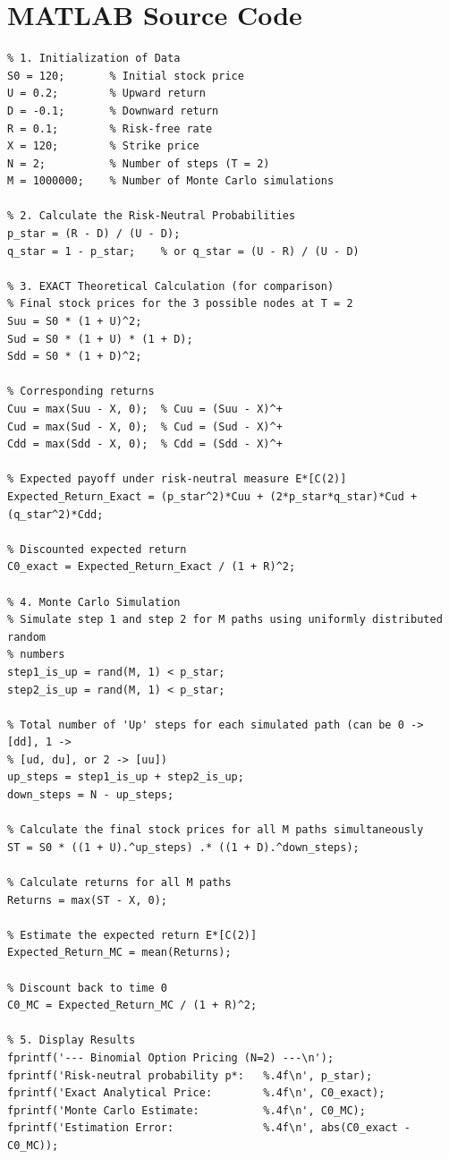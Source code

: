 \documentclass[12pt, a4paper]{article}
\begin{document}
\section{MATLAB Source Code}
\begin{lstlisting}
% 1. Initialization of Data
S0 = 120;       % Initial stock price
U = 0.2;        % Upward return
D = -0.1;       % Downward return
R = 0.1;        % Risk-free rate
X = 120;        % Strike price
N = 2;          % Number of steps (T = 2)
M = 1000000;    % Number of Monte Carlo simulations

% 2. Calculate the Risk-Neutral Probabilities
p_star = (R - D) / (U - D);
q_star = 1 - p_star;    % or q_star = (U - R) / (U - D)

% 3. EXACT Theoretical Calculation (for comparison)
% Final stock prices for the 3 possible nodes at T = 2
Suu = S0 * (1 + U)^2;
Sud = S0 * (1 + U) * (1 + D);
Sdd = S0 * (1 + D)^2;

% Corresponding returns
Cuu = max(Suu - X, 0);  % Cuu = (Suu - X)^+
Cud = max(Sud - X, 0);  % Cud = (Sud - X)^+
Cdd = max(Sdd - X, 0);  % Cdd = (Sdd - X)^+

% Expected payoff under risk-neutral measure E*[C(2)]
Expected_Return_Exact = (p_star^2)*Cuu + (2*p_star*q_star)*Cud + (q_star^2)*Cdd;

% Discounted expected return
C0_exact = Expected_Return_Exact / (1 + R)^2;

% 4. Monte Carlo Simulation
% Simulate step 1 and step 2 for M paths using uniformly distributed random
% numbers
step1_is_up = rand(M, 1) < p_star;
step2_is_up = rand(M, 1) < p_star;

% Total number of 'Up' steps for each simulated path (can be 0 -> [dd], 1 ->
% [ud, du], or 2 -> [uu])
up_steps = step1_is_up + step2_is_up;
down_steps = N - up_steps;

% Calculate the final stock prices for all M paths simultaneously
ST = S0 * ((1 + U).^up_steps) .* ((1 + D).^down_steps);

% Calculate returns for all M paths
Returns = max(ST - X, 0);

% Estimate the expected return E*[C(2)]
Expected_Return_MC = mean(Returns);

% Discount back to time 0
C0_MC = Expected_Return_MC / (1 + R)^2;

% 5. Display Results
fprintf('--- Binomial Option Pricing (N=2) ---\n');
fprintf('Risk-neutral probability p*:   %.4f\n', p_star);
fprintf('Exact Analytical Price:        %.4f\n', C0_exact);
fprintf('Monte Carlo Estimate:          %.4f\n', C0_MC);
fprintf('Estimation Error:              %.4f\n', abs(C0_exact - C0_MC));
\end{lstlisting}
\end{document}
